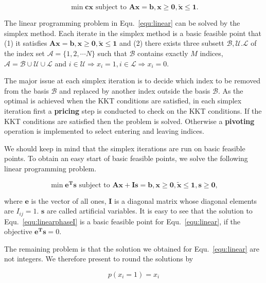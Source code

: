 \documentclass{llncs}
\begin{document}
\begin{equation}\label{equ:linear}
\min \mathbf{cx} \textrm{ subject to } \mathbf{Ax} = \mathbf{b}, \mathbf{x}\geq \mathbf{0},\tilde{\mathbf{x}} \leq \mathbf{1}.
\end{equation}

The linear programming problem in Equ.~\ref{equ:linear} can be solved by the simplex method. Each iterate in the simplex method is a basic feasible point that (1) it satisfies $\mathbf{Ax} = \mathbf{b}, \mathbf{x}\geq \mathbf{0},\tilde{\mathbf{x}} \leq \mathbf{1}$ and (2) there exists three subsett $\mathcal{B,U.L}$ of the index set $\mathcal{A}=\{1,2,\cdots N\}$ such that $\mathcal{B}$ contains exactly $M$ indices, $\mathcal{A}=\mathcal{B}\cup \mathcal{U} \cup \mathcal{L}$ and $i \in \mathcal{U} \Rightarrow x_i=1,i \in \mathcal{L} \Rightarrow x_i=0$.

The major issue at each simplex iteration is to decide which index to be removed from the basis $\mathcal{B}$ and replaced by another index outside the basis $\mathcal{B}$.  As the optimal is achieved when the KKT conditions are satisfied, in each simplex iteration first  a \textbf{pricing} step is conducted to check on the KKT conditions.  If the KKT conditions are satisfied then the problem is solved. Otherwise a \textbf{pivoting} operation is implemented to select entering and leaving indices.

We should keep in mind that the simplex iterations are run on basic feasible points. To obtain an easy start of basic feasible points, we solve the following linear programming problem.

\begin{equation}\label{equ:linearphaseI}
\min \mathbf{e^{T}s} \textrm{ subject to } \mathbf{Ax} + \mathbf{Is} = \mathbf{b}, \mathbf{x}\geq \mathbf{0},\tilde{\mathbf{x}} \leq \mathbf{1},\mathbf{s}\geq \mathbf{0},
\end{equation}

where $\mathbf{e}$ is the vector of all ones, $\mathbf{I}$ is a diagonal matrix whose diagonal elements are $I_{ij}=1$. $\mathbf{s}$ are called artificial variables. It is easy to see that the solution to Equ.~\ref{equ:linearphaseI} is a basic feasible point for Equ.~\ref{equ:linear}, if the objective $\mathbf{e^{T}s}=0 $.

The remaining problem is that the solution we obtained for Equ.~\ref{equ:linear} are not integers. We therefore present to round the solutions by

\begin{equation}
p(x_i=1)= x_i
\end{equation}
\end{document}
